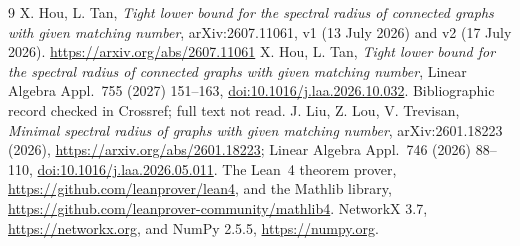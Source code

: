 \documentclass[11pt]{article}
\theoremstyle{definition}
\begin{document}
\begin{thebibliography}{9}
 X. Hou, L. Tan, \emph{Tight lower bound for the spectral radius of connected
graphs with given matching number}, arXiv:2607.11061, v1 (13 July 2026) and v2
(17 July 2026). \url{https://arxiv.org/abs/2607.11061}
 X. Hou, L. Tan, \emph{Tight lower bound for the spectral radius of
connected graphs with given matching number}, Linear Algebra Appl.\ 755 (2027) 151--163,
\href{https://doi.org/10.1016/j.laa.2026.10.032}{doi:10.1016/j.laa.2026.10.032}.
Bibliographic record checked in Crossref; full text not read.
 J. Liu, Z. Lou, V. Trevisan, \emph{Minimal spectral radius of graphs with
given matching number}, arXiv:2601.18223 (2026), \url{https://arxiv.org/abs/2601.18223};
Linear Algebra Appl.\ 746 (2026) 88--110,
\href{https://doi.org/10.1016/j.laa.2026.05.011}{doi:10.1016/j.laa.2026.05.011}.
 The Lean~4 theorem prover, \url{https://github.com/leanprover/lean4}, and
the Mathlib library, \url{https://github.com/leanprover-community/mathlib4}.
 NetworkX 3.7, \url{https://networkx.org}, and NumPy 2.5.5,
\url{https://numpy.org}.
\end{thebibliography}
\end{document}
